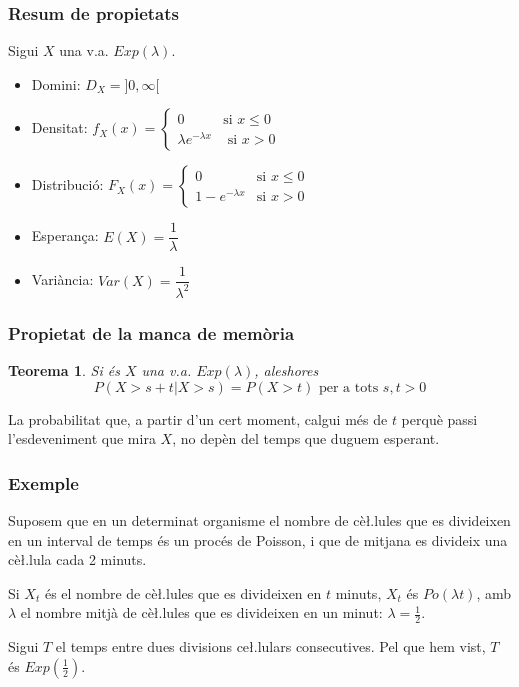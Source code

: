 \documentclass[12pt,t]{beamer}\usepackage[]{graphicx}\usepackage[]{color}
\renewcommand{\leq}{\leqslant}
\theoremstyle{plain}
\newtheorem{teorema}{Teorema}
\theoremstyle{definition}
\begin{document}
\begin{frame}
\frametitle{Resum de propietats}
 Sigui $X$ una v.a. $Exp(\lambda)$.
\begin{itemize}
\item  Domini: $D_X=]0,\infty[$
\medskip

\item Densitat: $f_X(x)=\left\{\begin{array}{ll}
0 & \mbox{si } x\leq 0\\ \lambda e^{-\lambda x}  & \mbox{ si $x>0$}
\end{array} \right.$
\medskip

\item Distribució: $F_X(x)=\left\{
\begin{array}{ll} 0 & \mbox{si $x\leq 0$}\\
  1-e^{-\lambda x} & \mbox{si $x> 0$}
  \end{array}\right.
$
 \medskip
         
\item Esperança: $E(X)= \dfrac{1}{\lambda}$
\medskip

\item Variància: $Var(X)= \dfrac{1}{\lambda^2}$
\end{itemize}

\end{frame}


\begin{frame}
    \frametitle{Propietat de la manca de memòria}


\begin{teorema}
Si és $X$ una v.a. $Exp(\lambda)$,  aleshores
$$
P(X> s+t|X> s)=P(X>t)\mbox{ per a tots $s,t>0$}
$$
\end{teorema}
\medskip

La probabilitat que, a partir d'un cert moment, calgui més de $t$  perquè passi l'esdeveniment que mira $X$, no depèn del temps que duguem esperant.
 \end{frame}



\begin{frame}
\frametitle{Exemple}

Suposem que en un determinat organisme el nombre de cè\l.lules que es divideixen en un interval de temps és un procés de Poisson, i que de mitjana es divideix una cè\l.lula cada 2 minuts.\medskip

Si $X_t$ és el nombre de cè\l.lules que es divideixen en $t$ minuts, $X_t$ és $Po(\lambda t)$, amb $\lambda$ el nombre mitjà de cè\l.lules que es divideixen en un minut: $\lambda=\frac{1}{2}$.\medskip


Sigui $T$ el temps entre dues divisions ce\l.lulars consecutives. Pel que hem vist, $T$ és  $Exp(\frac{1}{2})$.
 \end{frame}
\end{document}
